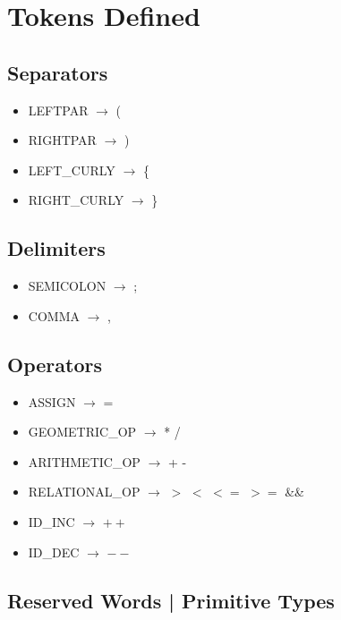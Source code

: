 \documentclass{article}
\begin{document}
\newpage

\section{Tokens Defined}

\subsection{Separators}

\begin{itemize}
\item LEFTPAR $\rightarrow$ (
\item RIGHTPAR $\rightarrow$ )
\item LEFT\_CURLY $\rightarrow$ \{
\item RIGHT\_CURLY $\rightarrow$ \}
\end{itemize}

\subsection{Delimiters}

\begin{itemize}
\item SEMICOLON $\rightarrow$ ;
\item COMMA $\rightarrow$ ,
\end{itemize}

\subsection{Operators}

\begin{itemize}

\item ASSIGN $\rightarrow$ =
\item GEOMETRIC\_OP $\rightarrow$ *  /
\item ARITHMETIC\_OP $\rightarrow$ +  -
\item RELATIONAL\_OP $\rightarrow$ $>$  $<$ $<=$ $>=$ \&\& \text{\textbar\textbar}
\item ID\_INC $\rightarrow$ $++$
\item ID\_DEC $\rightarrow$ $--$
\end{itemize}

\subsection{Reserved Words | Primitive Types}
\end{document}
